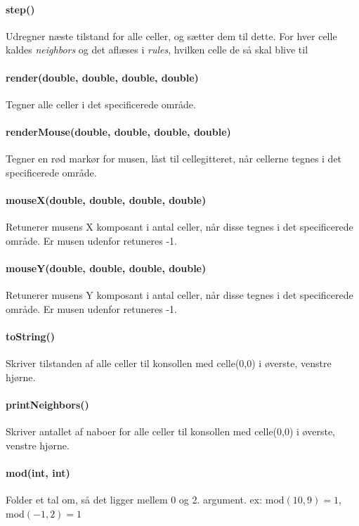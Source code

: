 \paragraph{step()} Udregner næste tilstand for alle celler, og sætter dem til dette.
For hver celle kaldes \emph{neighbors} og det aflæses i \emph{rules}, hvilken celle de så skal blive til

\paragraph{render(double, double, double, double)} Tegner alle celler i det specificerede område.

\paragraph{renderMouse(double, double, double, double)} Tegner en rød markør for musen, låst til cellegitteret, når cellerne tegnes i det specificerede område.

\paragraph{mouseX(double, double, double, double)} Retunerer musens X komposant i antal celler, når disse tegnes i det specificerede område.
Er musen udenfor retuneres -1.

\paragraph{mouseY(double, double, double, double)} Retunerer musens Y komposant i antal celler, når disse tegnes i det specificerede område.
Er musen udenfor retuneres -1.

\paragraph{toString()} Skriver tilstanden af alle celler til konsollen med celle(0,0) i øverste, venstre hjørne.

\paragraph{printNeighbors()} Skriver antallet af naboer for alle celler til konsollen med celle(0,0) i øverste, venstre hjørne.

\paragraph{mod(int, int)} Folder et tal om, så det ligger mellem 0 og 2. argument. ex: mod$(10, 9) = 1$, mod$(-1, 2) = 1$

